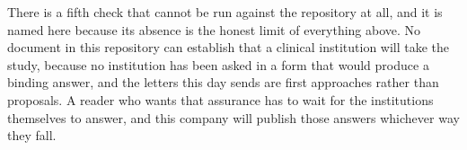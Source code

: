 There is a fifth check that cannot be run against the repository at all, and it
is named here because its absence is the honest limit of everything above. No
document in this repository can establish that a clinical institution will take
the study, because no institution has been asked in a form that would produce a
binding answer, and the letters this day sends are first approaches rather than
proposals. A reader who wants that assurance has to wait for the institutions
themselves to answer, and this company will publish those answers whichever way
they fall.

